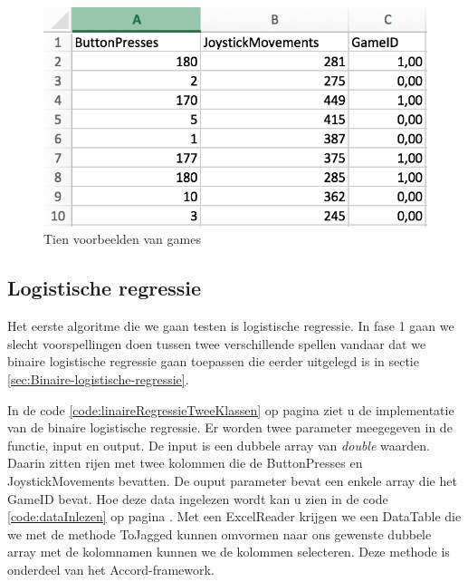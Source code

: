 \begin{figure}[]
	\centering
	\includegraphics{img/Dataset}
	\caption{Tien voorbeelden van games}
	\label{fig:regressieFig}
\end{figure}


\newpage

\subsection{Logistische regressie}
\label{sec:Logistischeregressie-fase1}

Het eerste algoritme die we gaan testen is logistische regressie. In fase 1 gaan we slecht voorspellingen doen tussen twee verschillende spellen vandaar dat we binaire logistische regressie gaan toepassen die eerder uitgelegd is in sectie \ref{sec:Binaire-logistische-regressie}.

In de code \ref{code:linaireRegressieTweeKlassen} op pagina \pageref{code:linaireRegressieTweeKlassen} ziet u de implementatie van de binaire logistische regressie. Er worden twee parameter meegegeven in de functie, input en output. De input is een dubbele array van \textit{double} waarden. Daarin zitten rijen met twee kolommen die de ButtonPresses en JoystickMovements bevatten. De ouput parameter bevat een enkele array die het GameID bevat. Hoe deze data ingelezen wordt kan u zien in de code \ref{code:dataInlezen} op pagina \pageref{code:dataInlezen}. Met een ExcelReader krijgen we een DataTable die we met de methode ToJagged kunnen omvormen naar ons gewenste dubbele array met de kolomnamen kunnen we de kolommen selecteren. Deze methode is onderdeel van het Accord-framework. 



